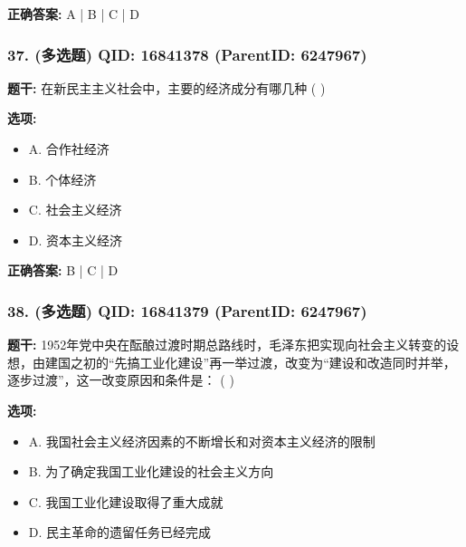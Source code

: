 \documentclass[12pt,UTF8]{ctexart}
\begin{document}
\textbf{正确答案:}
A | B | C | D

\vspace{0.3em}\hrulefill\vspace{0.7em}

\subsubsection*{37. (多选题) \small QID: 16841378 (ParentID: 6247967)}

\textbf{题干:}
在新民主主义社会中，主要的经济成分有哪几种 ( )



\textbf{选项:}
\begin{itemize}[leftmargin=*]

  \item A. 合作社经济

  \item B. 个体经济

  \item C. 社会主义经济

  \item D. 资本主义经济

\end{itemize}

\textbf{正确答案:}
B | C | D

\vspace{0.3em}\hrulefill\vspace{0.7em}

\subsubsection*{38. (多选题) \small QID: 16841379 (ParentID: 6247967)}

\textbf{题干:}
1952年党中央在酝酿过渡时期总路线时，毛泽东把实现向社会主义转变的设想，由建国之初的“先搞工业化建设”再一举过渡，改变为“建设和改造同时并举，逐步过渡”，这一改变原因和条件是： ( )



\textbf{选项:}
\begin{itemize}[leftmargin=*]

  \item A. 我国社会主义经济因素的不断增长和对资本主义经济的限制

  \item B. 为了确定我国工业化建设的社会主义方向

  \item C. 我国工业化建设取得了重大成就

  \item D. 民主革命的遗留任务已经完成

\end{itemize}
\end{document}
